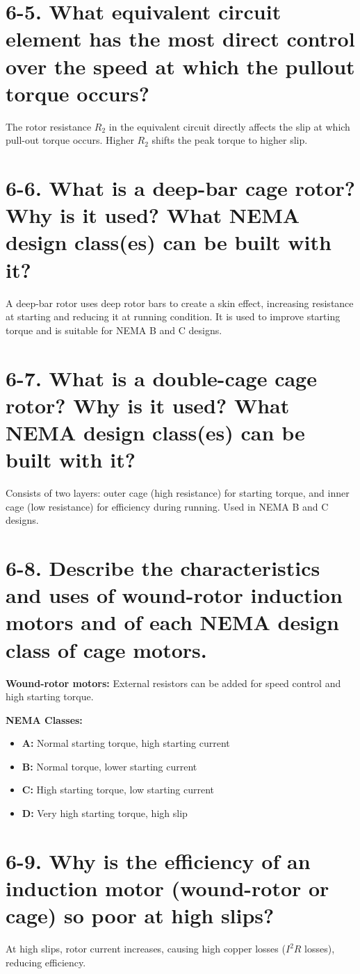 \documentclass[a4paper,12pt]{article}
\begin{document}
\section*{6-5. What equivalent circuit element has the most direct control over the speed at which the pullout torque occurs?}
The rotor resistance $R_2$ in the equivalent circuit directly affects the slip at which pull-out torque occurs. Higher $R_2$ shifts the peak torque to higher slip.

\section*{6-6. What is a deep-bar cage rotor? Why is it used? What NEMA design class(es) can be built with it?}
A deep-bar rotor uses deep rotor bars to create a skin effect, increasing resistance at starting and reducing it at running condition. It is used to improve starting torque and is suitable for NEMA B and C designs.

\section*{6-7. What is a double-cage cage rotor? Why is it used? What NEMA design class(es) can be built with it?}
Consists of two layers: outer cage (high resistance) for starting torque, and inner cage (low resistance) for efficiency during running. Used in NEMA B and C designs.

\section*{6-8. Describe the characteristics and uses of wound-rotor induction motors and of each NEMA design class of cage motors.}
\textbf{Wound-rotor motors:} External resistors can be added for speed control and high starting torque.

\textbf{NEMA Classes:}
\begin{itemize}
	\item \textbf{A:} Normal starting torque, high starting current
	\item \textbf{B:} Normal torque, lower starting current
	\item \textbf{C:} High starting torque, low starting current
	\item \textbf{D:} Very high starting torque, high slip
\end{itemize}

\section*{6-9. Why is the efficiency of an induction motor (wound-rotor or cage) so poor at high slips?}
At high slips, rotor current increases, causing high copper losses ($I^2R$ losses), reducing efficiency.
\end{document}
